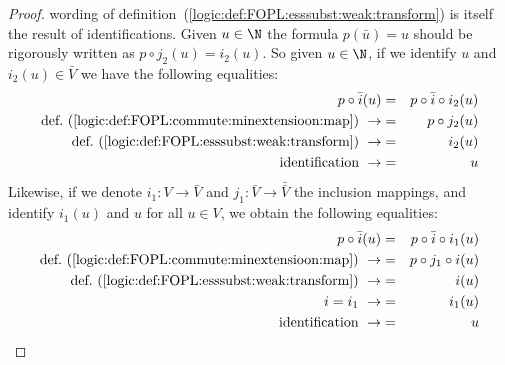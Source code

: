 \begin{proof}
wording of definition~(\ref{logic:def:FOPL:esssubst:weak:transform})
is itself the result of identifications. Given $u\in\N$ the formula
$p(\bar{u})=u$ should be rigorously written as $p\circ
j_{2}(u)=i_{2}(u)$. So given $u\in\N$, if we identify $u$ and
$i_{2}(u)\in\bar{V}$ we have the following equalities:
    \begin{eqnarray*}
    p\circ\bar{i}(u)&=&p\circ\bar{i}\circ i_{2}(u)\\
    \mbox{def.~(\ref{logic:def:FOPL:commute:minextensioon:map})}\ \rightarrow
    &=&p\circ j_{2}(u)\\
    \mbox{def.~(\ref{logic:def:FOPL:esssubst:weak:transform})}\ \rightarrow
    &=&i_{2}(u)\\
    \mbox{identification}\ \rightarrow&=&u
    \end{eqnarray*}
Likewise, if we denote $i_{1}:V\to\bar{V}$ and
$j_{1}:\bar{V}\to\bar{\bar{V}}$ the inclusion mappings, and identify
$i_{1}(u)$ and $u$ for all $u\in V$, we obtain the following
equalities:
    \begin{eqnarray*}
    p\circ\bar{i}(u)&=&p\circ\bar{i}\circ i_{1}(u)\\
    \mbox{def.~(\ref{logic:def:FOPL:commute:minextensioon:map})}\ \rightarrow
    &=&p\circ j_{1}\circ i(u)\\
    \mbox{def.~(\ref{logic:def:FOPL:esssubst:weak:transform})}\ \rightarrow
    &=&i(u)\\
    i=i_{1}\ \rightarrow&=&i_{1}(u)\\
    \mbox{identification}\ \rightarrow&=&u
    \end{eqnarray*}
\end{proof}

